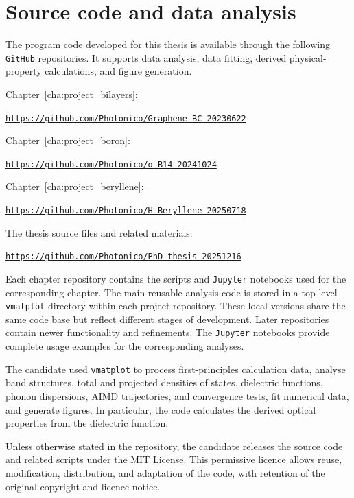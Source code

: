 \chapter{Source code and data analysis}
\label{cha:appendix_code}

The program code developed for this thesis is available through the following \texttt{GitHub} repositories.
It supports data analysis, data fitting,
derived physical-property calculations, and figure generation.

\hyperref[cha:project_bilayers]{Chapter~\ref*{cha:project_bilayers}: }

\quad\href{https://github.com/Photonico/Graphene-BC_20230622}
{\texttt{https://github.com/Photonico/Graphene-BC\_20230622}}

\hyperref[cha:project_boron]{Chapter~\ref*{cha:project_boron}: }

\quad\href{https://github.com/Photonico/o-B14_20241024}
{\texttt{https://github.com/Photonico/o-B14\_20241024}}

\hyperref[cha:project_beryllene]{Chapter~\ref*{cha:project_beryllene}: }

\quad\href{https://github.com/Photonico/H-Beryllene_20250718}
{\texttt{https://github.com/Photonico/H-Beryllene\_20250718}}

The thesis source files and related materials:

\quad\href{https://github.com/Photonico/PhD_thesis_20251216}
{\texttt{https://github.com/Photonico/PhD\_thesis\_20251216}}

Each chapter repository contains the scripts and \texttt{Jupyter} notebooks used for the corresponding chapter.
The main reusable analysis code is stored in a top-level \texttt{vmatplot} directory within each project repository.
These local versions share the same code base but reflect different stages of development.
Later repositories contain newer functionality and refinements.
The \texttt{Jupyter} notebooks provide complete usage examples for the corresponding analyses.

The candidate used \texttt{vmatplot} to process first-principles calculation data,
analyse band structures,
total and projected densities of states, dielectric functions, phonon dispersions,
AIMD trajectories, and convergence tests, fit numerical data, and generate figures.
In particular,
the code calculates the derived optical properties from the dielectric function.

Unless otherwise stated in the repository,
the candidate releases the source code and related scripts under the MIT License.
This permissive licence allows reuse,
modification, distribution, and adaptation of the code,
with retention of the original copyright and licence notice.
